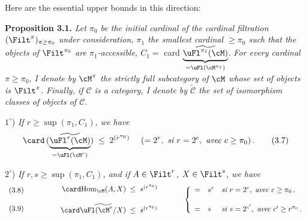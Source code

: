
Here are the essential upper bounds in this direction:

\textbf{Proposition 3.1.} \textit{Let $\pi_0$ be the initial cardinal of the cardinal filtration} $(\Filt^\pi)_{\pi\geq\pi_0}$ \textit{under consideration, $\pi_1$ the smallest cardinal $\geq\pi_0$ such that the objects of} $\Filt^{\pi_0}$ \textit{are $\pi_1$-accessible, $C_1=$} card $\underbrace{\widetilde{\uFl^{\pi_1}(\cM)}}_{=\uFl(\cM^{\pi_1})}$. \textit{For every cardinal $\pi\geq\pi_0$, I denote by $\cM^\pi$ the strictly full subcategory of $\cM$ whose set of objects is} $\Filt^\pi$. \textit{Finally, if $\mathcal{C}$ is a category, I denote by $\widetilde{\mathcal{C}}$ the set of isomorphism classes of objects of $\mathcal{C}$.}

$1^\circ$) \textit{If $r\geq\sup(\pi_1,C_1)$, we have}
\[
\card\,(\underbrace{\widetilde{\uFl^r(\cM)}}_{=\uFl(\cM^r)}) \;\leq\; 2^{(r^{\pi_0})} \quad\ (=2^r,\ \textit{si } r=2^c,\ \textit{avec } c\geq\pi_0)\,.
\tag*{(3.7)}
\]

$2^\circ$) \textit{If $r,s\geq\sup(\pi_1,C_1)$, and if $A\in\Filt^r$, $X\in\Filt^s$, we have}
\[
\begin{array}{l}
\text{(3.8)}\\[3ex]
\text{(3.9)}
\end{array}
\qquad\qquad
\begin{array}{r@{\;\;\leq\;\;}l}
\card\mathrm{Hom}_{\cM}(A,X) & s^{(r^{\pi_0})}\\[3ex]
\card\widetilde{\uFl(\cM^r/X)} & s^{(r^{\pi_0})}
\end{array}
\qquad\quad
\left\{
\begin{array}{lll}
= & s^r & \textit{si } r=2^c,\ \textit{avec } c\geq\pi_0\,,\\[3ex]
= & s & \textit{si } s=2^{c'},\ \textit{avec } c'\geq r^{\pi_0}\,.
\end{array}
\right.
\]

